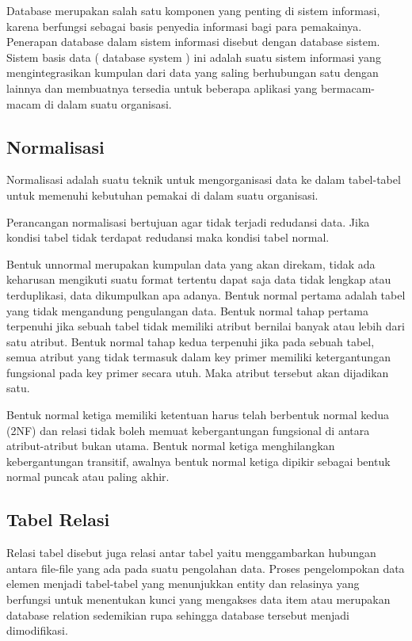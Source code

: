 \documentclass{jtetiproposalskripsi}
\begin{document}
Database merupakan salah satu komponen yang penting di sistem informasi, karena berfungsi sebagai basis penyedia informasi bagi para pemakainya. Penerapan database dalam sistem informasi disebut dengan database sistem. Sistem basis data ( database system ) ini adalah suatu sistem informasi yang mengintegrasikan kumpulan dari data yang saling berhubungan satu dengan lainnya dan membuatnya tersedia untuk beberapa aplikasi yang bermacam-macam di dalam suatu organisasi.

\subsection{Normalisasi}
Normalisasi adalah suatu teknik untuk mengorganisasi data ke dalam tabel-tabel untuk memenuhi kebutuhan pemakai di dalam suatu organisasi.

Perancangan normalisasi bertujuan agar tidak terjadi redudansi data. Jika kondisi tabel tidak terdapat redudansi maka kondisi tabel normal.

Bentuk unnormal merupakan kumpulan data yang akan direkam, tidak ada keharusan mengikuti suatu format tertentu dapat saja data tidak lengkap atau terduplikasi, data dikumpulkan apa adanya.
Bentuk normal pertama adalah tabel yang tidak mengandung pengulangan data. Bentuk normal tahap pertama terpenuhi jika sebuah tabel tidak memiliki atribut bernilai banyak atau lebih dari satu atribut.
Bentuk normal tahap kedua terpenuhi jika pada sebuah tabel, semua atribut yang tidak termasuk dalam key primer memiliki ketergantungan fungsional pada key primer secara utuh. Maka atribut tersebut akan dijadikan satu.

Bentuk normal ketiga memiliki ketentuan harus telah berbentuk normal kedua (2NF) dan relasi tidak boleh memuat kebergantungan fungsional di antara atribut-atribut bukan utama. Bentuk normal ketiga menghilangkan kebergantungan transitif, awalnya bentuk normal ketiga dipikir sebagai bentuk normal puncak atau paling akhir.

\subsection{Tabel Relasi}
Relasi tabel disebut juga relasi antar tabel yaitu menggambarkan hubungan antara file-file yang ada pada suatu pengolahan data. Proses pengelompokan data elemen menjadi tabel-tabel yang menunjukkan entity dan relasinya yang berfungsi untuk menentukan kunci yang mengakses data item atau merupakan database relation sedemikian rupa sehingga database tersebut menjadi dimodifikasi.
\end{document}
